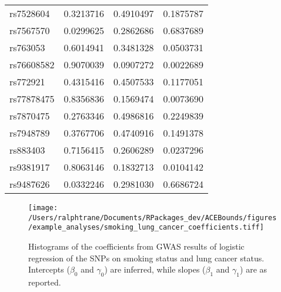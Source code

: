 \documentclass[AMA,STIX1COL,]{WileyNJD-v2}
\begin{document}
\begin{table}[ht]
\begin{minipage}{0.5\linewidth}
\begin{tabular}{lrrr}
rs7528604 & 0.3213716 & 0.4910497 & 0.1875787\\
rs7567570 & 0.0299625 & 0.2862686 & 0.6837689\\
\addlinespace
rs763053 & 0.6014941 & 0.3481328 & 0.0503731\\
rs76608582 & 0.9070039 & 0.0907272 & 0.0022689\\
rs772921 & 0.4315416 & 0.4507533 & 0.1177051\\
rs77878475 & 0.8356836 & 0.1569474 & 0.0073690\\
rs7870475 & 0.2763346 & 0.4986816 & 0.2249839\\
\addlinespace
rs7948789 & 0.3767706 & 0.4740916 & 0.1491378\\
rs883403 & 0.7156415 & 0.2606289 & 0.0237296\\
rs9381917 & 0.8063146 & 0.1832713 & 0.0104142\\
rs9487626 & 0.0332246 & 0.2981030 & 0.6686724\\
\bottomrule
\end{tabular}


  \end{minipage}
\end{table}

\begin{figure}[ht]
  \center
  \texttt{[image: /Users/ralphtrane/Documents/RPackages\_dev/ACEBounds/figures/example\_analyses/smoking\_lung\_cancer\_coefficients.tiff]}
  \caption{Histograms of the coefficients from GWAS results of logistic regression of the SNPs on smoking status and lung cancer status. Intercepts ($\beta_0$ and $\gamma_0$) are inferred, while slopes ($\beta_1$ and $\gamma_1$) are as reported.}
  \label{fig:marginal-distribution-of-coefficients-lung-cancer}
\end{figure}
\end{document}
